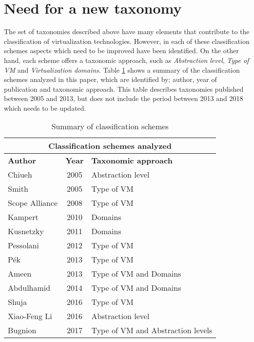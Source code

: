 	\section {Need for a new taxonomy}\label{sec:necesidadDeUnaTaxonomia}
	
	The set of taxonomies described above have many elements that contribute to the classification of virtualization technologies. However, in each of these classification schemes aspects which need to be improved have been identified. On the other hand, each scheme offers a taxonomic approach, such as \textit{Abstraction level}, \textit{Type of VM} and \textit{Virtualization domains}. Table \ref{cuadro:resumenTrabajos} shows a summary of the classification schemes analyzed in this paper, which are identified by; author, year of publication and taxonomic approach. This table describes taxonomies published between 2005 and 2013, but does not include the period between 2013 and 2018 which needs to be updated.
	
	
	
	\begin{table}[H]
		\centering
		\begin{tabular}{|l|c|p{3.9cm}|}
			\hline
			\multicolumn{3}{|c|}{\textbf{Classification schemes analyzed}}\\
			\hline
			\textbf{Author} & \textbf{Year} & \textbf{Taxonomic approach} \\ 
			\hline
			Chiueh          & 2005          & Abstraction level\\ 
			\hline
			Smith           & 2005          & Type of VM\\ 
			\hline
			Scope Alliance  & 2008          & Type of VM\\ 
			\hline
			Kampert         & 2010          & Domains\\ 
			\hline
			Kusnetzky       & 2011          & Domains\\ 
			\hline
			Pessolani       & 2012          & Type of VM\\ 
			\hline
			P{\'e}k         & 2013          & Type of VM\\ 
			\hline
			Ameen           & 2013          & Type of VM and Domains\\ 
			\hline
			Abdulhamid      & 2014          & Type of VM and Domains\\ 
			\hline
			Shuja           & 2016          & Type of VM\\ 
			\hline
			Xiao-Feng Li    & 2016          & Abstraction level\\ 
			\hline
			Bugnion         & 2017          & Type of VM and Abstraction levels\\ 
			\hline
		\end{tabular}
		\caption{Summary of classification schemes}
		\label{cuadro:resumenTrabajos}
		
	\end{table}

